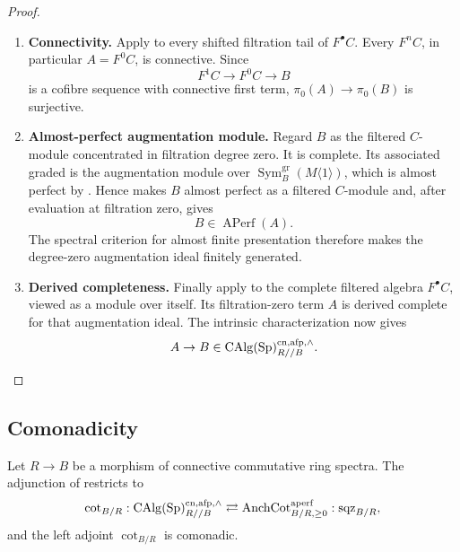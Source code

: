 \begin{proof}
\leavevmode
\begin{enumerate}[label=\textup{(\arabic*)}]
    \item \textbf{Connectivity.}
    Apply  to every shifted filtration tail
    of \(F^\bullet C\). Every \(F^nC\), in particular \(A=F^0C\), is
    connective. Since
    \[
        F^1C\longrightarrow F^0C\longrightarrow B
    \]
    is a cofibre sequence with connective first term, \(\pi_0(A)\to\pi_0(B)\) is
    surjective.
    \item \textbf{Almost-perfect augmentation module.}
    Regard \(B\) as the filtered \(C\)-module concentrated in filtration degree
    zero. It is complete. Its associated graded is the augmentation module over
    \(\operatorname{Sym}^{\mathrm{gr}}_B(M\langle1\rangle)\), which is almost perfect by
    . Hence
     makes \(B\) almost perfect as a
    filtered \(C\)-module and, after evaluation at filtration zero, gives
    \[
        B\in\operatorname{APerf}(A).
    \]
    The spectral criterion for almost finite presentation therefore makes the degree-zero
    augmentation ideal finitely generated.
    \item \textbf{Derived completeness.}
    Finally apply
     to the
    complete filtered algebra \(F^\bullet C\), viewed as a module over itself.
    Its filtration-zero term \(A\) is derived complete for that augmentation
    ideal. The intrinsic characterization
     now gives
    \[
        A\to B\in\operatorname{CAlg}(\operatorname{Sp})^{\mathrm{cn},\mathrm{afp},\wedge}_{R//B}.
    \]
\end{enumerate}
\end{proof}

\subsection{Comonadicity}

\begin{theorem}
\label{thm:cotangent-square-zero-comonadicity}
Let \(R\to B\) be a morphism of connective commutative ring spectra. The
adjunction of  restricts to
\[
    \operatorname{cot}_{B/R}
    :
    \operatorname{CAlg}(\operatorname{Sp})^{\mathrm{cn},\mathrm{afp},\wedge}_{R//B}
    \rightleftarrows
    \operatorname{AnchCot}^{\mathrm{aperf}}_{B/R,\geq0}
    :
    \operatorname{sqz}_{B/R},
\]
and the left adjoint \(\operatorname{cot}_{B/R}\) is comonadic.
\end{theorem}

